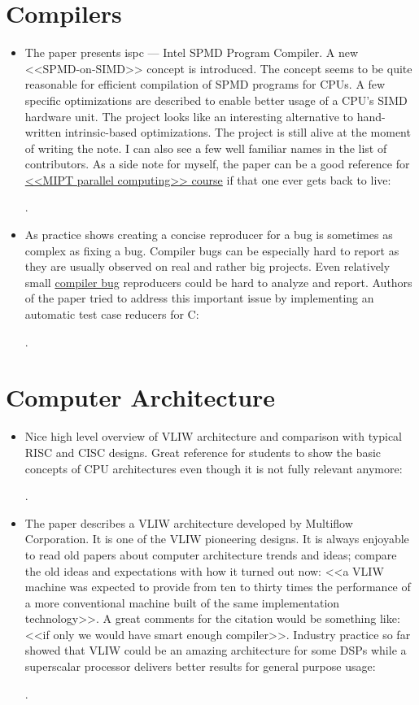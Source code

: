 \section*{Compilers}
\begin{itemize}
    \item The paper presents ispc --- Intel SPMD Program Compiler. A new <<SPMD-on-SIMD>> concept is introduced. The concept seems to be quite reasonable for efficient compilation of SPMD programs for CPUs. A few specific optimizations are described to enable better usage of a CPU's SIMD hardware unit. The project looks like an interesting alternative to hand-written intrinsic-based optimizations. The project is still alive at the moment of writing the note. I can also see a few well familiar names in the list of contributors. As a side note for myself, the paper can be a good reference for \href{https://github.com/yulyugin/mipt-parallel-computing}{<<MIPT parallel computing>> course} if that one ever gets back to live:

    \cite{Pharr:ispc:2012}.

    \item As practice shows creating a concise reproducer for a bug is sometimes as complex as fixing a bug. Compiler bugs can be especially hard to report as they are usually observed on real and rather big projects. Even relatively small \href{https://yulyugin.github.io/blog/2022/icc-bug}{compiler bug} reproducers could be hard to analyze and report. Authors of the paper tried to address this important issue by implementing an automatic test case reducers for C:

    \cite{Regehr:C-Reduce:2012}.
\end{itemize}

\section*{Computer Architecture}
\begin{itemize}
    \item Nice high level overview of VLIW architecture and comparison with typical RISC and CISC designs. Great reference for students to show the basic concepts of CPU architectures even though it is not fully relevant anymore:

    \cite{Philips:VLIW:1997}.

    \item The paper describes a VLIW architecture developed by Multiflow Corporation. It is one of the VLIW pioneering designs. It is always enjoyable to read old papers about computer architecture trends and ideas; compare the old ideas and expectations with how it turned out now: <<a VLIW machine was expected to provide from ten to thirty times the performance of a more conventional machine built of the same implementation technology>>. A great comments for the citation would be something like: <<if only we would have smart enough compiler>>. Industry practice so far showed that VLIW could be an amazing architecture for some DSPs while a superscalar processor delivers better results for general purpose usage:

    \cite{Colwell:Multiflow-VLIW:1987}.
\end{itemize}


